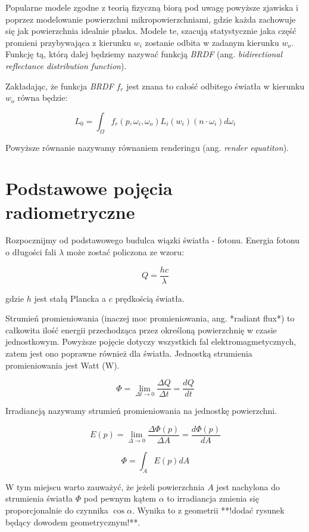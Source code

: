 \documentclass[../main.tex]{subfiles}
\begin{document}
Popularne modele zgodne z teorią fizyczną biorą pod uwagę powyższe zjawiska i
poprzez modelowanie powierzchni mikropowierzchniami, gdzie każda zachowuje się
jak powierzchnia idealnie płaska. Modele te, szacują statystycznie jaka część
promieni przybywająca z kierunku $w_i$ zostanie odbita w zadanym kierunku
$w_o$. Funkcję tą, którą dalej będziemy nazywać funkcją \textit{BRDF} (ang.
\textit{bidirectional reflectance distribution function}).

Zakładając, że funkcja \textit{BRDF} $f_r$ jest znana to całość odbitego
światła w kierunku $w_o$ równa będzie:

\[
L_0 = \int_{\Omega} {
    f_r(p, \omega_i, \omega_o)
    L_i(w_i)
    (n \cdot \omega_i)
    d \omega_i
}
\]

Powyższe równanie nazywamy równaniem renderingu (ang. \textit{render equatiton}).

\section{Podstawowe pojęcia radiometryczne}

Rozpocznijmy od podstawowego budulca wiązki światła - fotonu. Energia fotonu
o długości fali $\lambda$ może zostać policzona ze wzoru:

$$ Q = \frac{hc}{\lambda} $$

gdzie $h$ jest stałą Plancka a $c$ prędkością światła.

Strumień promieniowania (inaczej moc promieniowania, ang. *radiant flux*) to
całkowita ilość energii przechodząca przez określoną powierzchnię w czasie
jednostkowym. Powyższe pojęcie dotyczy wszystkich fal elektromagmetycznych,
zatem jest ono poprawne również dla światła. Jednostką strumienia
promieniowania jest Watt ($\text{W}$).

$$
\Phi = \lim_{\Delta t \rightarrow 0}{
    \frac{\Delta Q}{\Delta t}=\frac{dQ}{dt}
}
$$

Irradiancją nazywamy strumień promieniowania na jednostkę powierzchni.

$$
E(p) =
    \lim_{\Delta \rightarrow 0} {
        \frac{\Delta \Phi(p)}{\Delta A}
    } =
    \frac{d\Phi(p)}{dA}
$$

$$
\Phi = \int_{A} {
    E(p)
    dA
}
$$

W tym miejscu warto zauważyć, że jeżeli powierzchnia $A$ jest nachylona do
strumienia światła $\Phi$ pod pewnym kątem $\alpha$ to irradiancja zmienia się
proporcjonalnie do czynnika $\cos \alpha$. Wynika to z geometrii **!dodać
rysunek będący dowodem geometrycznym!**.
\end{document}
